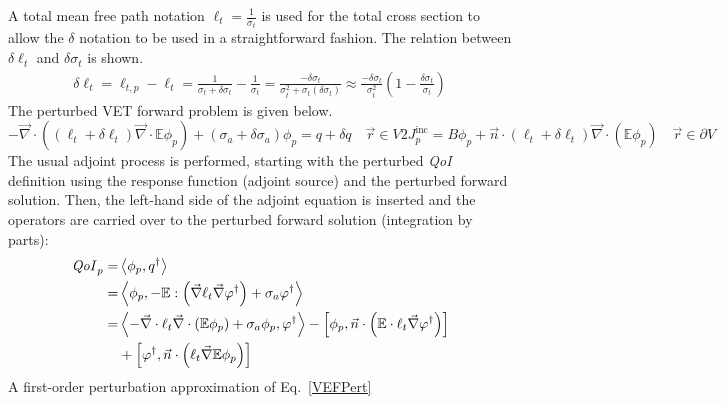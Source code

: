 \documentclass[12pt]{report}
\newcommand{\vr}{\vec{r}}
\newcommand{\bra}{\left\langle}
\newcommand{\ket}{\right\rangle}
\newcommand{\sbra}{\left[}
\newcommand{\sket}{\right]}
\renewcommand{\div}{\vec{\nabla} \cdot}
\newcommand{\grad}{\vec{\nabla}}
\newcommand{\vefadj}{\varphi^\dag}
\newcommand{\domain}{V}
\newcommand{\bound}{\partial V}
\newcommand{\vn}{\vec{n}}
\newcommand{\Edd}{\mathbb{E}}
\newcommand{\sigt}{\sigma_t}
\newcommand{\siga}{\sigma_a}
\newcommand{\isigt}{\ell_t}
\newcommand{\scalSource}{q}
\newcommand{\scalResp}{q^\dag}
\newcommand{\qoi}{{\it QoI}\xspace}
\begin{document}
A total mean free path notation $\isigt=\frac{1}{\sigt}$ is used for the total cross section to allow the $\delta$ notation to be used in a straightforward fashion. The relation between $\delta \isigt$ and $\delta \sigt$ is shown. 
\begin{equation}
\begin{split}
\delta \isigt  = \ell_{t,p} - \isigt 
 = \frac{1}{\sigt + \delta \sigt} - \frac{1}{\sigt} 
 = \frac{ - \delta \sigt}{\sigt^2 + \sigt ( \delta \sigt) } 
 \approx  \frac{ - \delta \sigt}{\sigt^2} \left( 1 - \frac{\delta \sigt}{\sigt}\right)
\end{split}
\end{equation}
The perturbed VET forward problem is given below.
\begin{subequations}
\begin{equation}
\label{VEFPert}
- \div \left((\isigt + \delta \isigt)\div \Edd \phi_p \right) + (\siga + \delta \siga)\phi_p = \scalSource + \delta \scalSource  \quad \vr \in \domain
\end{equation}
\begin{equation}
 2J_p^\text{inc} = B \phi_p  + \vn \cdot  (\isigt + \delta \isigt) \vec{\nabla} \cdot \left(\Edd \phi_p \right)  \quad \vr \in \bound
\end{equation}
\end{subequations}
The usual adjoint process is performed, starting with the perturbed \qoi definition using the response function (adjoint source) and the perturbed forward solution. Then, the left-hand side of the adjoint equation is inserted and the operators are carried over to the perturbed forward solution (integration by parts):
\begin{equation}
\label{VETSensDeriv}
\begin{split}
\qoi_p = &\bra \phi_p , \scalResp \ket \\
       = &\bra \phi_p , - \Edd : \left( \grad \isigt \grad \varphi^\dag \right) + \siga \vefadj \ket \\
       = & \bra - \div \isigt \div \left( \Edd \phi_p \right) + \siga \phi_p, \vefadj \ket 
 - \sbra \phi_p , \vn \cdot \left( \Edd \cdot \isigt \grad \vefadj\right) \sket  \\ 
&+ \sbra \vefadj , \vn \cdot  \left(  \isigt \grad \Edd \phi_p \right) \sket \\
\end{split}
\end{equation}
A first-order perturbation approximation of Eq.~\eqref{VEFPert}
\end{document}

